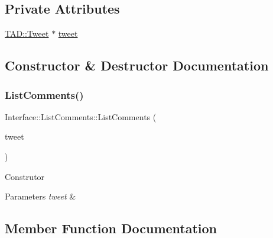 \subsection*{Private Attributes}
\begin{DoxyCompactItemize}
\item 
\hyperlink{class_t_a_d_1_1_tweet}{T\+A\+D\+::\+Tweet} $\ast$ \hyperlink{class_interface_1_1_list_comments_a4d7e333288fc27c09172b7d98344d02c}{tweet}
\end{DoxyCompactItemize}


\subsection{Constructor \& Destructor Documentation}
\mbox{\label{class_interface_1_1_list_comments_aed618ace7a52bd5b4ab7f61e233f8251}} 
\subsubsection{\texorpdfstring{List\+Comments()}{ListComments()}}
{\footnotesize\ttfamily Interface\+::\+List\+Comments\+::\+List\+Comments (\begin{DoxyParamCaption}\item[{\hyperlink{class_t_a_d_1_1_tweet}{T\+A\+D\+::\+Tweet} $\ast$}]{tweet }\end{DoxyParamCaption})\hspace{0.3cm}{\ttfamily [explicit]}}

Construtor 
\begin{DoxyParams}{Parameters}
{\em tweet} & \\
\hline
\end{DoxyParams}


\subsection{Member Function Documentation}
\mbox{\label{class_interface_1_1_list_comments_a18a4829f8ee9639d6395b1789613b797}} 
